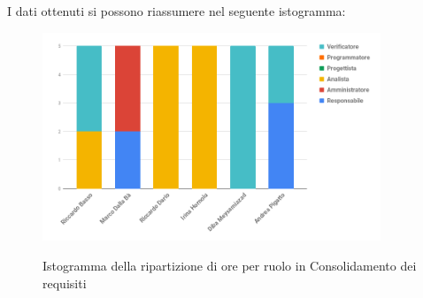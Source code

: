 \pagebreak
I dati ottenuti si possono riassumere nel seguente istogramma:
\begin{figure}[H] 
			\centering 
				\includegraphics[width=0.9\textwidth]{res/images/istogramma_consolidamento.png}\\
				\caption{Istogramma della ripartizione di ore per ruolo in Consolidamento dei requisiti}
			\label{IstogrammaConsolidamento}
\end{figure}

